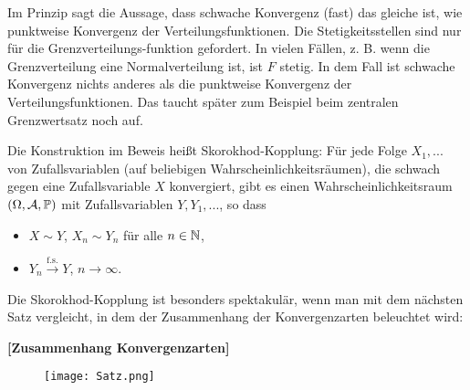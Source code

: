 Im Prinzip sagt die Aussage, dass schwache Konvergenz (fast) das gleiche ist, wie punktweise Konvergenz der Verteilungsfunktionen. Die Stetigkeitsstellen sind nur f\"ur die Grenzverteilungs-funktion gefordert. In vielen F\"allen, z. B. wenn die Grenzverteilung eine Normalverteilung ist, ist $F$ stetig. In dem Fall ist schwache Konvergenz nichts anderes als die punktweise Konvergenz der Verteilungsfunktionen. Das taucht sp\"ater zum Beispiel beim zentralen Grenzwertsatz noch auf.
\begin{bem}
	Die Konstruktion im Beweis heißt Skorokhod-Kopplung: Für jede Folge $X_1, ...$ von Zufallsvariablen (auf beliebigen Wahrscheinlichkeitsr\"aumen), die schwach gegen eine Zufallsvariable $X$ konvergiert, gibt es einen Wahrscheinlichkeitsraum $(\Omega, \mathcal{A}, \mathbb{P})$ mit Zufallsvariablen $Y, Y_1,...$, so dass
	\begin{itemize}
		\item $X \sim Y$, $X_n \sim Y_n$ f\"ur alle $n\in\mathbb{N}$,
		\item $Y_n \overset{\text{f.s.}}{\longrightarrow} Y$, $n \to \infty$.
	\end{itemize}
\end{bem}
Die Skorokhod-Kopplung ist besonders spektakul\"ar, wenn man mit dem n\"achsten Satz vergleicht, 
in dem der Zusammenhang der Konvergenzarten beleuchtet wird:
\begin{satz}
 \textbf{[Zusammenhang Konvergenzarten]}
\begin{figure}[H]
\begin{center}
\texttt{[image: Satz.png]}
\end{center}
\end{figure}
\end{satz}


